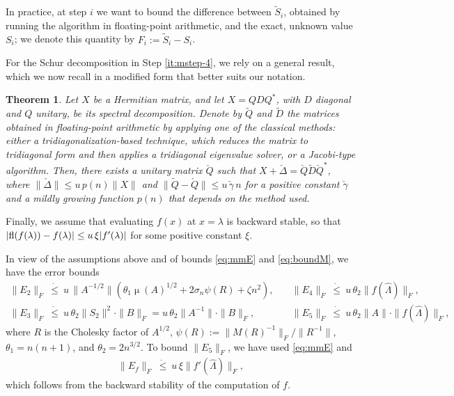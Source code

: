 \documentclass[DIV=14]{scrartcl}
\newcommand\ledot{~\dot{\le}~}
\theoremstyle{thmstyletwo}
\newtheorem{theorem}{Theorem}
\newtheorem{remark}[theorem]{Remark}
\theoremstyle{definition}
\numberwithin{equation}{section}
\newcommand{\wh}{\widehat}
\newcommand{\wt}{\widetilde}
\newcommand{\wc}{\check}
\renewcommand{\Delta}{\varDelta}
\newcommand{\deq}{\ensuremath{:=}}
\DeclareMathOperator{\cond}{\mu}
\renewcommand{\Lambda}{\varLambda}
\begin{document}
{In practice, at step $i$ we want to bound the difference between $\widetilde S_i$, obtained by running the algorithm in floating-point arithmetic, and the exact, unknown value $S_i$; we denote this quantity by $F_i\deq{}\widetilde S_i-S_i$.

 For the Schur decomposition in Step \ref{it:mstep-4}, we rely on a general result, which we now recall in a modified form that better suits our notation.

\begin{theorem}{{\cite[Theorem 3.3]{drma20}}}\label{th:eigerr}
Let $X$ be a Hermitian matrix, and let $X=QDQ^*$, with $D$ diagonal and $Q$ unitary, be its spectral decomposition. Denote by $\wt Q$ and $\wt D$ the matrices obtained in floating-point arithmetic by applying one of the classical methods: either a tridiagonalization-based technique, which reduces the matrix to tridiagonal form and then applies a tridiagonal eigenvalue solver, or a Jacobi-type algorithm. Then, there exists a unitary matrix $\wc Q$ such that $X+\wc \Delta=\wc Q\wt D\wc Q^*$, where $\|\wc\Delta\|\le u\,p(n)\|X\|$ and $\|\wt Q-\wc Q\|\le u\,\wc\gamma\, n$ for a positive constant $\wc\gamma$ and a mildly growing function $p(n)$ that depends on the method used.
\end{theorem}

Finally, we assume that evaluating $f(x)$ at $x=\lambda$ is backward stable, so that $|\hbox{fl}(f(\lambda))-f(\lambda)|\le u\, \xi |f'(\lambda)| $ for some positive constant $\xi$.

In view of the assumptions above and of bounds
\eqref{eq:mmE} and \eqref{eq:boundM}, we have the error bounds
\begin{equation}\label{eq:as1}
   \begin{array}{ll}
    \|E_2\|_F\ledot u\,\|A^{-1/2}\|(\theta_1\cond(A)^{1/2}+2\sigma_n\psi(R) +\zeta n^2),\quad
    &\|E_4\|_F\ledot u\,\theta_2\|f(\wh \Lambda) \|_F,\\[1ex]
    \|E_3\|_F\ledot u\,\theta_2\|S_2\|^2\!\!\cdot \|B\|_F=u\,\theta_2\|A^{-1}\|\cdot \|B\|_F,
    &\|E_5\|_F\ledot u\,\theta_2\|A\|\cdot \|f(\wh \Lambda)\|_F,
 \end{array}
\end{equation}
where $R$ is the Cholesky factor of $A^{1/2}$, $\psi(R) \deq \|M(R)^{-1}\|_F/\|R^{-1}\|$, $\theta_1=n(n+1)$,
and  $\theta_2=2n^{3/2}$. To bound $\|E_5\|_F$, we have used \eqref{eq:mmE}
and
\begin{equation}\label{eq:as1bis}
 \begin{array}{lll}
    \|E_f\|_F\ledot u\, \xi \|f'(\wh \Lambda )\|_F,
 \end{array}
\end{equation}
which follows from the backward stability of the computation of $f$.

}
\end{document}
